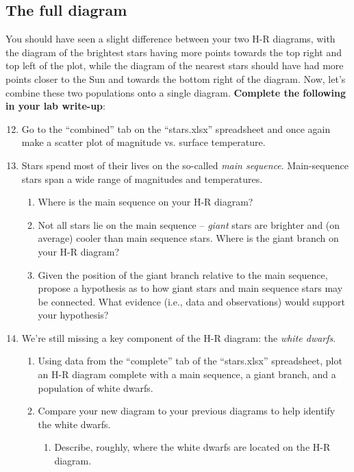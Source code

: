 \documentclass[11pt]{article}
\begin{document}
\subsection{The full diagram}
You should have seen a slight difference between your two H-R diagrams, with the diagram of the brightest stars having more points towards the top right and top left of the plot, while the diagram of the nearest stars should have had more points closer to the Sun and towards the bottom right of the diagram. Now, let's combine these two populations onto a single diagram. \textbf{Complete the following in your lab write-up}:
\begin{enumerate}
\setcounter{enumi}{11}

    \item Go to the ``combined'' tab on the ``stars.xlsx'' spreadsheet and once again make a scatter plot of magnitude vs. surface temperature.
    
    \item Stars spend most of their lives on the so-called \emph{main sequence}. Main-sequence stars span a wide range of magnitudes and temperatures.
    \begin{enumerate}
        \item Where is the main sequence on your H-R diagram? 
        
        \item Not all stars lie on the main sequence -- \emph{giant} stars are brighter and (on average) cooler than main sequence stars. Where is the giant branch on your H-R diagram?
        
        \item Given the position of the giant branch relative to the main sequence, propose a hypothesis as to how giant stars and main sequence stars may be connected. What evidence (i.e., data and observations) would support your hypothesis?
    
    \end{enumerate}
    
    \item We're still missing a key component of the H-R diagram: the \emph{white dwarfs}.
    \begin{enumerate}
        \item Using data from the ``complete'' tab of the ``stars.xlsx'' spreadsheet, plot an H-R diagram complete with a main sequence, a giant branch, and a population of white dwarfs.
        
        \item Compare your new diagram to your previous diagrams to help identify the white dwarfs.
        \begin{enumerate}
            \item Describe, roughly, where the white dwarfs are located on the H-R diagram. 
            

\end{enumerate}
\end{enumerate}
\end{enumerate}
\end{document}
